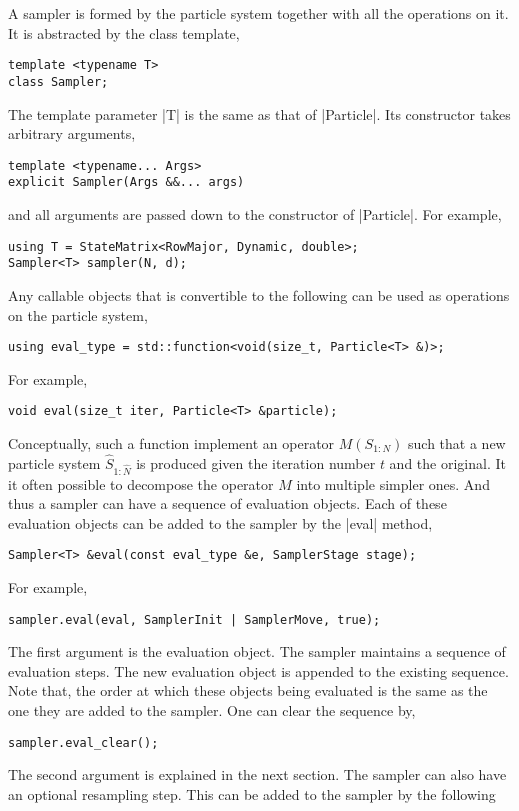 A sampler is formed by the particle system together with all the operations on
it. It is abstracted by the class template,
\begin{verbatim}
template <typename T>
class Sampler;
\end{verbatim}
The template parameter |T| is the same as that of |Particle|. Its constructor
takes arbitrary arguments,
\begin{verbatim}
template <typename... Args>
explicit Sampler(Args &&... args)
\end{verbatim}
and all arguments are passed down to the constructor of |Particle|. For
example,
\begin{verbatim}
using T = StateMatrix<RowMajor, Dynamic, double>;
Sampler<T> sampler(N, d);
\end{verbatim}
Any callable objects that is convertible to the following can be used as
operations on the particle system,
\begin{verbatim}
using eval_type = std::function<void(size_t, Particle<T> &)>;
\end{verbatim}
For example,
\begin{verbatim}
void eval(size_t iter, Particle<T> &particle);
\end{verbatim}
Conceptually, such a function implement an operator $M(S_{1:N})$ such that a
new particle system $\hat{S}_{1:\hat{N}}$ is produced given the iteration
number $t$ and the original. It it often possible to decompose the operator $M$
into multiple simpler ones. And thus a sampler can have a sequence of
evaluation objects. Each of these evaluation objects can be added to the
sampler by the |eval| method,
\begin{verbatim}
Sampler<T> &eval(const eval_type &e, SamplerStage stage);
\end{verbatim}
For example,
\begin{verbatim}
sampler.eval(eval, SamplerInit | SamplerMove, true);
\end{verbatim}
The first argument is the evaluation object. The sampler maintains a sequence
of evaluation steps. The new evaluation object is appended to the existing
sequence. Note that, the order at which these objects being evaluated is the
same as the one they are added to the sampler. One can clear the sequence by,
\begin{verbatim}
sampler.eval_clear();
\end{verbatim}
The second argument is explained in the next section. The sampler can also have
an optional resampling step. This can be added to the sampler by the following
